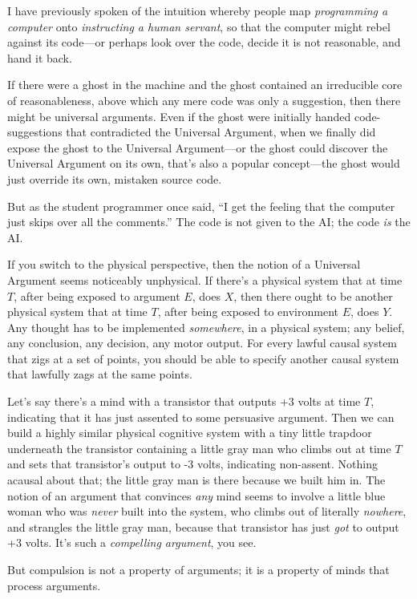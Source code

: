 {
 I have previously spoken of the intuition whereby people map
\textit{programming a computer} onto \textit{instructing a human
servant}, so that the computer might rebel against its code---or
perhaps look over the code, decide it is not reasonable, and hand it
back.}

{
 If there were a ghost in the machine and the ghost contained an
irreducible core of reasonableness, above which any mere code was only
a suggestion, then there might be universal arguments. Even if the
ghost were initially handed code-suggestions that contradicted the
Universal Argument, when we finally did expose the ghost to the
Universal Argument---or the ghost could discover the Universal Argument
on its own, that's also a popular concept---the ghost
would just override its own, mistaken source code.}

{
 But as the student programmer once said, ``I get
the feeling that the computer just skips over all the
comments.'' The code is not given to the AI; the code
\textit{is} the AI.}

{
 If you switch to the physical perspective, then the notion of a
Universal Argument seems noticeably unphysical. If
there's a physical system that at time $T$, after being
exposed to argument $E$, does $X$, then there ought to be another physical
system that at time $T$, after being exposed to environment $E$, does $Y$.
Any thought has to be implemented \textit{somewhere}, in a physical
system; any belief, any conclusion, any decision, any motor output. For
every lawful causal system that zigs at a set of points, you should be
able to specify another causal system that lawfully zags at the same
points.}

{
 Let's say there's a mind with a
transistor that outputs +3 volts at time $T$, indicating that it has just
assented to some persuasive argument. Then we can build a highly
similar physical cognitive system with a tiny little trapdoor
underneath the transistor containing a little gray man who climbs out
at time $T$ and sets that transistor's output to -3
volts, indicating non-assent. Nothing acausal about that; the little
gray man is there because we built him in. The notion of an argument
that convinces \textit{any} mind seems to involve a little blue woman
who was \textit{never} built into the system, who climbs out of
literally \textit{nowhere}, and strangles the little gray man, because
that transistor has just \textit{got} to output +3 volts.
It's such a \textit{compelling argument}, you see.}

{
 But compulsion is not a property of arguments; it is a property of
minds that process arguments.}

